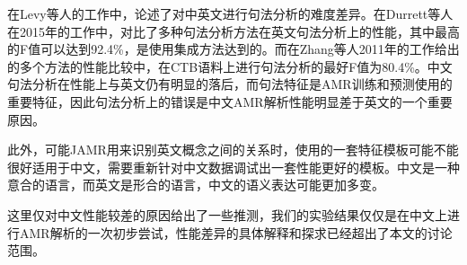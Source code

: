 \documentclass[master, winfont]{njuthesis}
\begin{document}
\begin{center}
	\begin{table}[!htbp]
		\caption{\label{closetest} AMR中英文封闭测试性能}
	\end{table}
\end{center}

在Levy等人的工作\cite{Levy2003Is}中，论述了对中英文进行句法分析的难度差异。在Durrett等人在2015年的工作\cite{Durrett2015Neural}中，对比了多种句法分析方法在英文句法分析上的性能，其中最高的F值可以达到92.4\%，是使用集成方法达到的。而在Zhang等人2011年的工作\cite{Zhang2011Syntactic}给出的多个方法的性能比较中，在CTB语料上进行句法分析的最好F值为80.4\%。中文句法分析在性能上与英文仍有明显的落后，而句法特征是AMR训练和预测使用的重要特征，因此句法分析上的错误是中文AMR解析性能明显差于英文的一个重要原因。

此外，可能JAMR用来识别英文概念之间的关系时，使用的一套特征模板可能不能很好适用于中文，需要重新针对中文数据调试出一套性能更好的模板。中文是一种意合的语言，而英文是形合的语言，中文的语义表达可能更加多变。

这里仅对中文性能较差的原因给出了一些推测，我们的实验结果仅仅是在中文上进行AMR解析的一次初步尝试，性能差异的具体解释和探求已经超出了本文的讨论范围。
\end{document}
